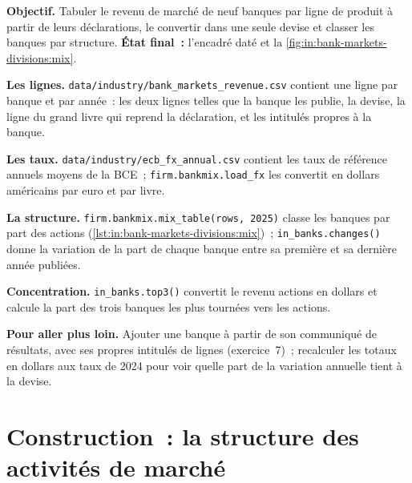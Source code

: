 \begin{tutorial}
\textbf{Objectif.} Tabuler le revenu de marché de neuf banques par ligne de produit à partir de leurs déclarations, le convertir dans une seule devise et
classer les banques par structure. \textbf{État final~:} l'encadré daté et la \cref{fig:in:bank-markets-divisions:mix}.
\begin{tutsteps}
\item \textbf{Les lignes.} \texttt{data/industry/bank\_markets\_revenue.csv} contient une ligne par banque et par année~: les deux
lignes telles que la banque les publie, la devise, la ligne du grand livre qui reprend la déclaration, et les intitulés propres à la banque.
\item \textbf{Les taux.} \texttt{data/industry/ecb\_fx\_annual.csv} contient les taux de référence annuels moyens de la BCE~;
\texttt{firm.bankmix.load\_fx} les convertit en dollars américains par euro et par livre.
\item \textbf{La structure.} \texttt{firm.bankmix.mix\_table(rows, 2025)} classe les banques par part des actions
(\cref{lst:in:bank-markets-divisions:mix})~; \texttt{in\_banks.changes()} donne la variation de la part de chaque banque entre sa
première et sa dernière année publiées.
\label{lst:in:bank-markets-divisions:mix}
\item \textbf{Concentration.} \texttt{in\_banks.top3()} convertit le revenu actions en dollars et calcule la part des
trois banques les plus tournées vers les actions.
\end{tutsteps}
\end{tutorial}

\textbf{Pour aller plus loin.} Ajouter une banque à partir de son communiqué de résultats, avec ses propres intitulés de lignes (exercice~7)~; recalculer
les totaux en dollars aux taux de 2024 pour voir quelle part de la variation annuelle tient à la devise.

\section{Construction~: la structure des activités de marché}\label{bld:in:bank-markets-divisions:bankmix}

